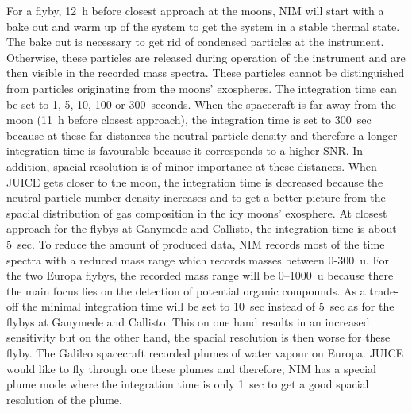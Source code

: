	For a flyby, 12~h before closest approach at the moons, NIM will start with a bake out and warm up of the system to get the system in a stable thermal state. The bake out is necessary to get rid of condensed particles at the instrument. Otherwise, these particles are released during operation of the instrument and are then visible in the recorded mass spectra. These particles cannot be distinguished from particles originating from the moons' exospheres. The integration time can be set to 1, 5, 10, 100 or 300~seconds. When the spacecraft is far away from the moon (11~h before closest approach), the integration time is set to 300~sec because at these far distances the neutral particle density and therefore a longer integration time is favourable because it corresponds to a higher SNR. In addition, spacial resolution is of minor importance at these distances. When JUICE gets closer to the moon, the integration time is decreased because the neutral particle number density increases and to get a better picture from the spacial distribution of gas composition in the icy moons' exosphere. At closest approach for the flybys at Ganymede and Callisto, the integration time is about 5~sec. To reduce the amount of produced data, NIM records most of the time spectra with a reduced mass range which records masses between 0-300~u. For the two Europa flybys, the recorded mass range will be 0--1000~u because there the main focus lies on the detection of potential organic compounds. As a trade-off the minimal integration time will be set to 10~sec instead of 5~sec as for the flybys at Ganymede and Callisto. This on one hand results in an increased sensitivity but on the other hand, the spacial resolution is then worse for these flyby. The Galileo spacecraft recorded plumes of water vapour on Europa. JUICE would like to fly through one these plumes and therefore, NIM has a special plume mode where the integration time is only 1~sec to get a good spacial resolution of the plume.
	
	
